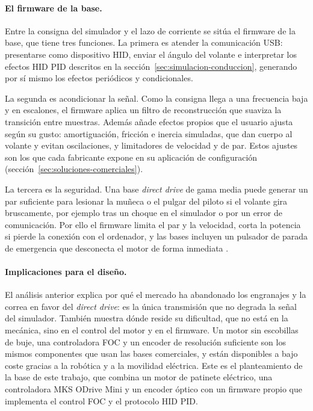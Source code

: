 \paragraph{El firmware de la base.}
Entre la consigna del simulador y el lazo de corriente se sitúa el firmware de la base, que tiene tres funciones. La primera es atender la comunicación USB: presentarse como dispositivo HID, enviar el ángulo del volante e interpretar los efectos HID PID descritos en la sección~\ref{sec:simulacion-conduccion}, generando por sí mismo los efectos periódicos y condicionales.

La segunda es acondicionar la señal. Como la consigna llega a una frecuencia baja y en escalones, el firmware aplica un filtro de reconstrucción que suaviza la transición entre muestras. Además añade efectos propios que el usuario ajusta según su gusto: amortiguación, fricción e inercia simuladas, que dan cuerpo al volante y evitan oscilaciones, y limitadores de velocidad y de par. Estos ajustes son los que cada fabricante expone en su aplicación de configuración (sección~\ref{sec:soluciones-comerciales}).

La tercera es la seguridad. Una base \textit{direct drive} de gama media puede generar un par suficiente para lesionar la muñeca o el pulgar del piloto si el volante gira bruscamente, por ejemplo tras un choque en el simulador o por un error de comunicación. Por ello el firmware limita el par y la velocidad, corta la potencia si pierde la conexión con el ordenador, y las bases incluyen un pulsador de parada de emergencia que desconecta el motor de forma inmediata \parencite{simucube_safety}.

\paragraph{Implicaciones para el diseño.}
El análisis anterior explica por qué el mercado ha abandonado los engranajes y la correa en favor del \textit{direct drive}: es la única transmisión que no degrada la señal del simulador. También muestra dónde reside su dificultad, que no está en la mecánica, sino en el control del motor y en el firmware. Un motor sin escobillas de buje, una controladora FOC y un encoder de resolución suficiente son los mismos componentes que usan las bases comerciales, y están disponibles a bajo coste gracias a la robótica y a la movilidad eléctrica. Este es el planteamiento de la base de este trabajo, que combina un motor de patinete eléctrico, una controladora MKS ODrive Mini y un encoder óptico con un firmware propio que implementa el control FOC y el protocolo HID PID.

